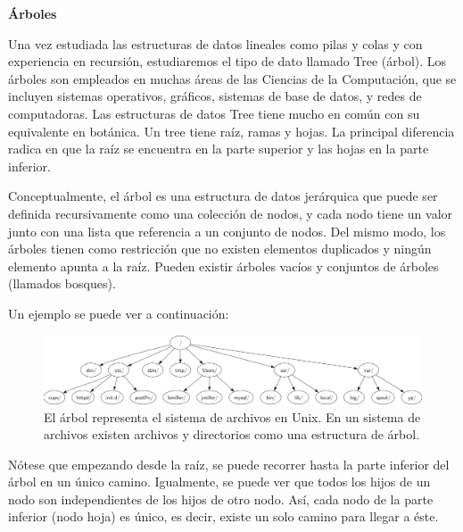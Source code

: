 \setcounter{section}{0}
\begin{center}
\huge{\textbf{Árboles}} \\
\end{center}

Una vez estudiada las estructuras de datos lineales como pilas y colas y con experiencia en recursión, estudiaremos el tipo de dato llamado Tree (árbol). Los árboles son empleados en muchas áreas de las Ciencias de la Computación, que se incluyen sistemas operativos, gráficos, sistemas de base de datos, y redes de computadoras. Las estructuras de datos Tree tiene mucho en común con su equivalente en botánica. Un tree tiene raíz, ramas y hojas. La principal diferencia radica en que la raíz se encuentra en la parte superior y las hojas en la parte inferior.

Conceptualmente, el árbol es una estructura de datos jerárquica que puede ser definida recursivamente como una colección de nodos, y cada nodo tiene un valor junto con una lista que referencia a un conjunto de nodos. Del mismo modo, los árboles tienen como restricción que no existen elementos duplicados y ningún elemento apunta a la raíz. Pueden existir árboles vacíos y conjuntos de árboles (llamados bosques).

Un ejemplo se puede ver a continuación:

\begin{figure}[htpb!]
  \begin{center}
    \includegraphics[width=1.0\textwidth]{images/extree1.png}
  \end{center}
  \caption{El árbol representa el sistema de archivos en Unix. En un sistema de archivos existen archivos y directorios como una estructura de árbol.}
  \label{fig:extree1}
\end{figure}

Nótese que empezando desde la raíz, se puede recorrer hasta la parte inferior del árbol en un único camino. Igualmente, se puede ver que todos los hijos de un nodo son independientes de los hijos de otro nodo. Así, cada nodo de la parte inferior (nodo hoja) es único, es decir, existe un solo camino para llegar a éste.

